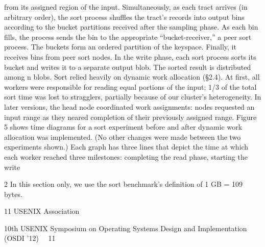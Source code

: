 from its assigned region of the input. Simultaneously,
as each tract arrives (in arbitrary order), the sort process
shuffles the tract’s records into output bins according to
the bucket partitions received after the sampling phase.
As each bin fills, the process sends the bin to the appropriate “bucket-receiver,” a peer sort process. The buckets
form an ordered partition of the keyspace. Finally, it receives bins from peer sort nodes.
In the write phase, each sort process sorts its bucket
and writes it to a separate output blob. The sorted result
is distributed among n blobs.
Sort relied heavily on dynamic work allocation (§2.4).
At first, all workers were responsible for reading equal
portions of the input; 1/3 of the total sort time was lost to
stragglers, partially because of our cluster’s heterogeneity. In later versions, the head node coordinated work assignments: nodes requested an input range as they neared
completion of their previously assigned range.
Figure 5 shows time diagrams for a sort experiment
before and after dynamic work allocation was implemented. (No other changes were made between the two
experiments shown.) Each graph has three lines that depict the time at which each worker reached three milestones: completing the read phase, starting the write

2 In this section only, we use the sort benchmark’s definition of 1 GB
= 109 bytes.

11
USENIX Association  

10th USENIX Symposium on Operating Systems Design and Implementation (OSDI ’12)  11


